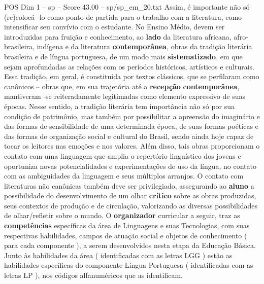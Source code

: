 \begin{textsample}{POS Dim 1 – sp – Score 43.00 – sp/sp\_em\_20.txt}
Assim, é importante não só (re)colocá -lo como ponto de partida para o trabalho com a literatura, como intensificar seu convívio com o estudante.
No Ensino Médio, devem ser introduzidas para fruição e conhecimento, ao \textbf{lado} da literatura africana, afro-brasileira, indígena e da literatura \textbf{contemporânea}, obras da tradição literária brasileira e de língua portuguesa, de um modo mais \textbf{sistematizado}, em que sejam aprofundadas as relações com os períodos históricos, artísticos e culturais.
Essa tradição, em geral, é constituída por textos clássicos, que se perfilaram como canônicos – obras que, em sua trajetória até a \textbf{recepção} \textbf{contemporânea}, mantiveram -se reiteradamente legitimadas como elemento expressivo de suas épocas.
Nesse sentido, a tradição literária tem importância não só por sua condição de patrimônio, mas também por possibilitar a apreensão do imaginário e das formas de sensibilidade de uma determinada época, de suas formas poéticas e das formas de organização social e cultural do Brasil, sendo ainda hoje capaz de tocar os leitores nas emoções e nos valores.
Além disso, tais obras proporcionam o contato com uma linguagem que amplia o repertório linguístico dos jovens e oportuniza novas potencialidades e experimentações de uso da língua, no contato com as ambiguidades da linguagem e seus múltiplos arranjos.
O contato com literaturas não canônicas também deve ser privilegiado, assegurando ao \textbf{aluno} a possibilidade do desenvolvimento de um olhar \textbf{crítico} sobre as obras produzidas, seus contextos de produção e de circulação, valorizando as diversas possibilidades de olhar/refletir sobre o mundo.
O \textbf{organizador} curricular a seguir, traz as \textbf{competências} específicas da área de Linguagens e suas Tecnologias, com suas respectivas habilidades, campos de atuação social e objetos de conhecimento ( para cada componente ), a serem desenvolvidos nesta etapa da Educação Básica.
Junto às habilidades da área ( identificadas com as letras LGG ) estão as habilidades específicas do componente Língua Portuguesa ( identificadas com as letras LP ), nos códigos alfanuméricos que as identificam.

\end{textsample}
